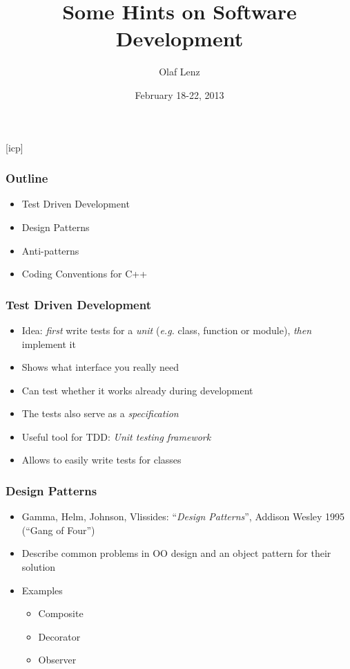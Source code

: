 \documentclass{slides}
\newcommand{\eg}{\textit{e.\thinspace g.}\xspace}
\begin{document}
\graphicspath{{figures/}}

\title[Some Hints on Software Development]{\Large Some Hints on Software Development}

\author[O. Lenz]{Olaf Lenz} 
\date{February 18-22, 2013}

\begin{frame}
  \titlepage
\end {frame}
[icp]

\begin{frame}
  \frametitle{Outline}
  \begin{itemize}
  \item Test Driven Development
  \item Design Patterns
  \item Anti-patterns
  \item Coding Conventions for C++
  \end{itemize}
\end{frame}

\begin{frame}
  \frametitle{Test Driven Development}
  \begin{itemize}
  \item Idea: \emph{first} write tests for a \emph{unit} (\eg class,
    function or module), \emph{then} implement it
  \item Shows what interface you really need
  \item Can test whether it works already during development
  \item The tests also serve as a \emph{specification}
  \item Useful tool for TDD: \emph{Unit testing framework}
  \item Allows to easily write tests for classes
  \end{itemize}
\end{frame}

\begin{frame}
  \frametitle{Design Patterns}
  \begin{itemize}
  \item Gamma, Helm, Johnson, Vlissides: ``\textit{Design Patterns}'',
    Addison Wesley 1995 (``Gang of Four'')
  \item Describe common problems in OO design and an object pattern
    for their solution
  \item Examples
    \begin{itemize}
    \item Composite
    \item Decorator
    \item Observer
    \end{itemize}
  \end{itemize}
\end{frame}
\end{document}
